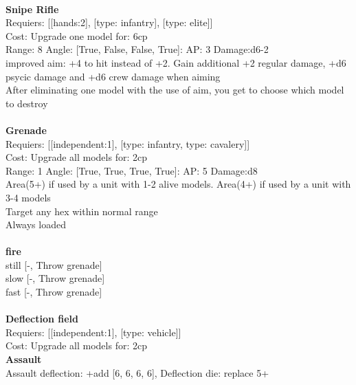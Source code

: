 \ \\
{\bf Snipe Rifle } \\

Requiers: [[hands:2], [type: infantry], [type: elite]] \\
Cost: Upgrade one model for: 6cp \\


Range: 8  Angle: [True, False, False, True]: AP: 3 Damage:d6-2 \\
improved aim: +4 to hit instead of +2. Gain additional +2 regular damage, +d6 psycic damage and +d6 crew damage when aiming\\ 
After eliminating one model with the use of aim, you get to choose which model to destroy\\ 








\ \\
{\bf Grenade } \\

Requiers: [[independent:1], [type: infantry, type: cavalery]] \\
Cost: Upgrade all models for: 2cp \\


Range: 1  Angle: [True, True, True, True]: AP: 5 Damage:d8 \\
Area(5+) if used by a unit with 1-2 alive models. Area(4+) if used by a unit with 3-4 models\\ 
Target any hex within normal range\\ 
Always loaded\\ 







\ \\ {\bf fire } \\
still [-, Throw grenade] \\
slow [-, Throw grenade] \\
fast [-, Throw grenade] \\

\ \\
{\bf Deflection field } \\

Requiers: [[independent:1], [type: vehicle]] \\
Cost: Upgrade all models for: 2cp \\




{\bf Assault} \ \\
Assault deflection: +add [6, 6, 6, 6], Deflection die: replace 5+
\\ 




